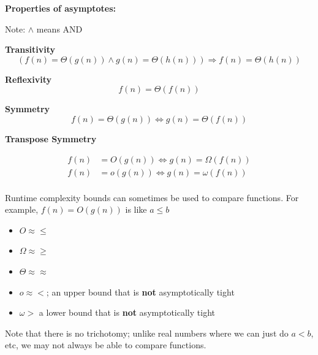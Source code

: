 \documentclass[../notes.tex]{subfiles}
\begin{document}
\begin{theorem}
	\textbf{Properties of asymptotes:} 

	Note: $\land $ means AND

	\textbf{Transitivity} 
	\begin{equation}
		(f(n) = \Theta(g(n)) \land g(n) = \Theta(h(n))) \Rightarrow f(n) = \Theta(h(n))
		\label{eq:358:asymptotic_transitivity}
	\end{equation} 


	\textbf{Reflexivity}
	\begin{equation}
		f(n) = \Theta(f(n))
		\label{eq:358:asymptotic_reflexivity}
	\end{equation}
	
	\textbf{Symmetry}
	\begin{equation}
		f(n) = \Theta(g(n)) \iff g(n) = \Theta(f(n))
		\label{eq:358:asymptotic_symmetry}
	\end{equation}
	

	\textbf{Transpose Symmetry}

	\begin{equation}
		\begin{split}
			 f(n) &= O(g(n)) \iff g(n) = \Omega(f(n))  \\
			 f(n) &= o(g(n)) \iff g(n) = \omega(f(n))  \\
		\end{split}
		\label{eq:358:asymptotic_transpose_symmetry}
	\end{equation}

\end{theorem}


Runtime complexity bounds can sometimes be used to compare functions. For example, $ f(n) = O(g(n)) $ is like $ a \le b $

\begin{itemize}
	\item $ O \approx \le $
	\item $ \Omega \approx \ge  $ 
	\item $ \Theta \approx \approx  $ 
	\item $ o \approx < $; an upper bound that is \textbf{not}  asymptotically tight
	\item $ \omega > $ a lower bound that is \textbf{not}  asymptotically tight
\end{itemize}

Note that there is no trichotomy; unlike real numbers where we can just do $ a<b $, etc, we may not always be able to compare functions.
\end{document}
